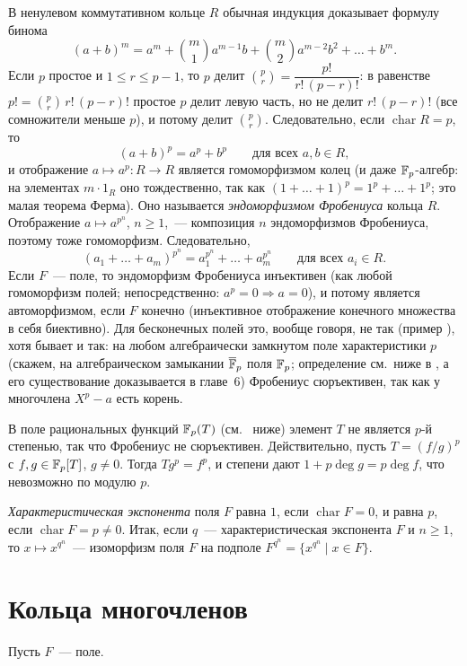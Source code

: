 В ненулевом коммутативном кольце $R$ обычная индукция доказывает формулу бинома
\[
(a+b)^m=a^m+\binom m1a^{m-1}b+\binom m2a^{m-2}b^2+\dots+b^m.
\]
Если $p$ простое и $1\le r\le p-1$, то $p$ делит $\binom pr=\dfrac{p!}{r!\,(p-r)!}$: в равенстве
$p!=\binom pr\,r!\,(p-r)!$ простое $p$ делит левую часть, но не делит $r!\,(p-r)!$ (все сомножители меньше $p$),
и потому делит $\binom pr$. Следовательно, если $\operatorname{char}R=p$, то
\[
(a+b)^p=a^p+b^p\qquad\text{для всех }a,b\in R,
\]
и отображение $a\mapsto a^p\colon R\to R$ является гомоморфизмом колец (и даже $\mathbb F_p$-алгебр: на элементах
$m\cdot1_R$ оно тождественно, так как $(1+\dots+1)^p=1^p+\dots+1^p$; это малая теорема Ферма). Оно называется
\emph{эндоморфизмом Фробениуса} кольца $R$. Отображение $a\mapsto a^{p^n}$, $n\ge1$,~--- композиция $n$ эндоморфизмов
Фробениуса, поэтому тоже гомоморфизм. Следовательно,
\[
(a_1+\dots+a_m)^{p^n}=a_1^{p^n}+\dots+a_m^{p^n}\qquad\text{для всех }a_i\in R.
\]
Если $F$~--- поле, то эндоморфизм Фробениуса инъективен (как любой гомоморфизм полей; непосредственно: $a^p=0\Rightarrow
a=0$), и потому является автоморфизмом, если $F$ конечно (инъективное отображение конечного множества в себя
биективно). Для бесконечных полей это, вообще говоря, не так (пример ), хотя бывает и так: на любом
алгебраически замкнутом поле характеристики $p$ (скажем, на алгебраическом замыкании $\overline{\mathbb F}_p$ поля $\mathbb F_p$; определение
см.\ ниже в , а его существование доказывается в главе~6)
Фробениус сюръективен, так как у многочлена $X^p-a$ есть корень.

\begin{example}[1.4a]
В поле рациональных функций $\mathbb F_p(T)$ (см.\  ниже) элемент $T$ не является $p$-й степенью, так что Фробениус не
сюръективен. Действительно, пусть $T=(f/g)^p$ с $f,g\in\mathbb F_p[T]$, $g\ne0$. Тогда $Tg^p=f^p$, и степени дают
$1+p\deg g=p\deg f$, что невозможно по модулю $p$.
\end{example}

\emph{Характеристическая экспонента} поля $F$ равна $1$, если $\operatorname{char}F=0$, и равна $p$, если
$\operatorname{char}F=p\ne0$. Итак, если $q$~--- характеристическая экспонента $F$ и $n\ge1$, то $x\mapsto x^{q^n}$~---
изоморфизм поля $F$ на подполе $F^{q^n}=\{x^{q^n}\mid x\in F\}$.

\section{Кольца многочленов}

Пусть $F$~--- поле.

